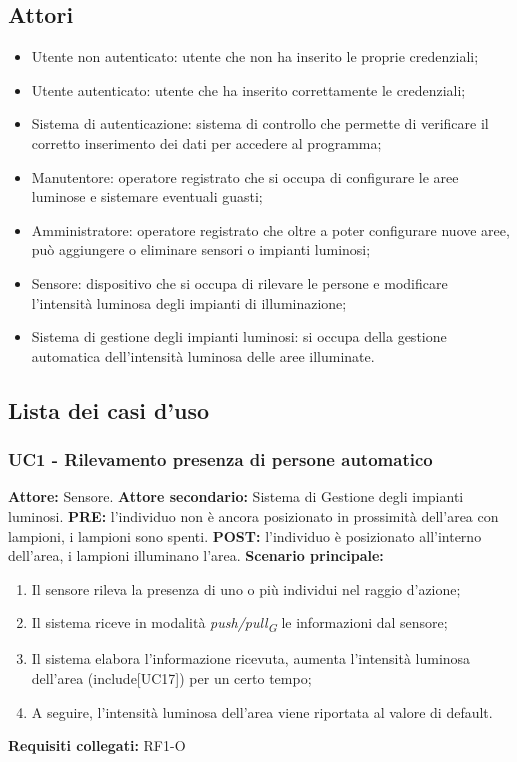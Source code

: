 \documentclass[a4paper, 12pt]{article}
\begin{document}
\subsection{Attori}
\begin{itemize}
    \item Utente non autenticato: utente che non ha inserito le proprie credenziali;
    \item Utente autenticato: utente che ha inserito correttamente le credenziali;
    \item Sistema di autenticazione: sistema di controllo che permette di verificare il corretto inserimento dei dati per accedere al programma;
    \item Manutentore: operatore registrato che si occupa di configurare le aree luminose e sistemare eventuali guasti;
    \item Amministratore: operatore registrato che oltre a poter configurare nuove aree, può aggiungere o eliminare sensori o impianti luminosi;
    \item Sensore: dispositivo che si occupa di rilevare le persone e modificare l'intensità luminosa degli impianti di illuminazione;
    \item Sistema di gestione degli impianti luminosi: si occupa della gestione automatica dell'intensità luminosa delle aree illuminate.
\end{itemize}

\subsection{Lista dei casi d'uso}

\subsubsection{UC1 - Rilevamento presenza di persone automatico}
\textbf{Attore:} Sensore.\newline
\textbf{Attore secondario:} Sistema di Gestione degli impianti luminosi.\newline
\textbf{PRE:} l'individuo non è ancora posizionato in prossimità dell'area con lampioni, i lampioni sono spenti.\newline
\textbf{POST:} l'individuo è posizionato all'interno dell'area, i lampioni illuminano l'area.\newline
\textbf{Scenario principale:}
\begin{enumerate}
    \item Il sensore rileva la presenza di uno o più individui nel raggio d'azione;
    \item Il sistema riceve in modalità \textit{push/pull\textsubscript{G}} le informazioni dal sensore;
    \item Il sistema elabora l'informazione ricevuta, aumenta l'intensità luminosa dell'area (include[UC17]) per un certo tempo;
    \item A seguire, l'intensità luminosa dell'area viene riportata al valore di default.
\end{enumerate}
\textbf{Requisiti collegati:} RF1-O\newline 
\end{document}
